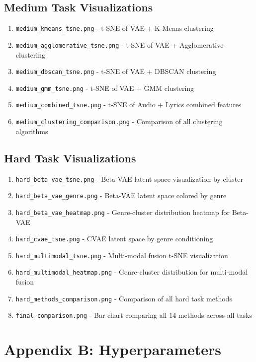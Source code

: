 \documentclass{article}
\begin{document}
\subsection{Medium Task Visualizations}
\begin{enumerate}
    \item \texttt{medium\_kmeans\_tsne.png} - t-SNE of VAE + K-Means clustering
    \item \texttt{medium\_agglomerative\_tsne.png} - t-SNE of VAE + Agglomerative clustering
    \item \texttt{medium\_dbscan\_tsne.png} - t-SNE of VAE + DBSCAN clustering
    \item \texttt{medium\_gmm\_tsne.png} - t-SNE of VAE + GMM clustering
    \item \texttt{medium\_combined\_tsne.png} - t-SNE of Audio + Lyrics combined features
    \item \texttt{medium\_clustering\_comparison.png} - Comparison of all clustering algorithms
\end{enumerate}

\subsection{Hard Task Visualizations}
\begin{enumerate}
    \item \texttt{hard\_beta\_vae\_tsne.png} - Beta-VAE latent space visualization by cluster
    \item \texttt{hard\_beta\_vae\_genre.png} - Beta-VAE latent space colored by genre
    \item \texttt{hard\_beta\_vae\_heatmap.png} - Genre-cluster distribution heatmap for Beta-VAE
    \item \texttt{hard\_cvae\_tsne.png} - CVAE latent space by genre conditioning
    \item \texttt{hard\_multimodal\_tsne.png} - Multi-modal fusion t-SNE visualization
    \item \texttt{hard\_multimodal\_heatmap.png} - Genre-cluster distribution for multi-modal fusion
    \item \texttt{hard\_methods\_comparison.png} - Comparison of all hard task methods
    \item \texttt{final\_comparison.png} - Bar chart comparing all 14 methods across all tasks
\end{enumerate}

\section{Appendix B: Hyperparameters}
\end{document}
